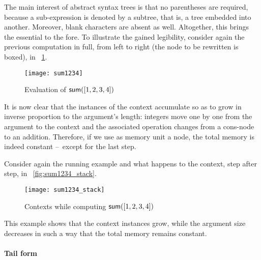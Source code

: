 The main interest of abstract syntax trees is that no parentheses are
required, because a sub\hyp{}expression is denoted by a subtree, that
is, a tree embedded into another. Moreover, blank characters are
absent as well. Altogether, this brings the essential to the fore. To
illustrate the gained legibility, consider again the previous
computation in full, from left to right (the node to be rewritten is
boxed), in \fig~\ref{fig:sum1234}.
\begin{figure}
\centering
\texttt{[image: sum1234]}
\caption{Evaluation of \(\textsf{sum}([1,2,3,4])\)}
\label{fig:sum1234}
\end{figure}
It is now clear that the instances of the context accumulate so as to
grow in inverse proportion to the argument's length: integers move one
by one from the argument to the context and the associated operation
changes from a cons\hyp{}node to an
addition. Therefore, if we use as memory unit a node, the total memory
is indeed constant --~except for the last step.

Consider again the running example and what happens to the context,
step after step, in \fig~\vref{fig:sum1234_stack}.
\begin{figure}[t]
\centering
\texttt{[image: sum1234\_stack]}
\caption{Contexts while computing \(\textsf{sum}([1,2,3,4])\)}
\label{fig:sum1234_stack}
\end{figure}
This example shows that the context instances grow, while the argument
size decreases in such a way that the total memory remains constant.

\paragraph{Tail form}
\label{sec:tail}

